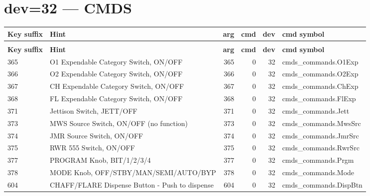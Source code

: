 \documentclass[10pt,a4paper]{article}
\begin{document}
\section{dev=32 — CMDS}
\begin{longtable}{>{\ttfamily\small}p{38mm} >{\small}p{72mm} r r r >{\ttfamily\small}p{48mm}}
\toprule
\textbf{Key suffix} & \textbf{Hint} & \textbf{arg} & \textbf{cmd} & \textbf{dev} & \textbf{cmd symbol} \\
\midrule
\endfirsthead
\multicolumn{6}{l}{\small\itshape continued\ldots}\\
\toprule
\textbf{Key suffix} & \textbf{Hint} & \textbf{arg} & \textbf{cmd} & \textbf{dev} & \textbf{cmd symbol} \\
\midrule
\endhead
\bottomrule
\endfoot
\rowcolor{rowodd}
  365 & O1 Expendable Category Switch, ON/OFF & 365 & 0 & 32 & cmds\_commands.O1Exp \\
  366 & O2 Expendable Category Switch, ON/OFF & 366 & 0 & 32 & cmds\_commands.O2Exp \\
\rowcolor{rowodd}
  367 & CH Expendable Category Switch, ON/OFF & 367 & 0 & 32 & cmds\_commands.ChExp \\
  368 & FL Expendable Category Switch, ON/OFF & 368 & 0 & 32 & cmds\_commands.FlExp \\
\rowcolor{rowodd}
  371 & Jettison Switch, JETT/OFF & 371 & 0 & 32 & cmds\_commands.Jett \\
  373 & MWS Source Switch, ON/OFF (no function) & 373 & 0 & 32 & cmds\_commands.MwsSrc \\
\rowcolor{rowodd}
  374 & JMR Source Switch, ON/OFF & 374 & 0 & 32 & cmds\_commands.JmrSrc \\
  375 & RWR 555 Switch, ON/OFF & 375 & 0 & 32 & cmds\_commands.RwrSrc \\
\rowcolor{rowodd}
  377 & PROGRAM Knob, BIT/1/2/3/4 & 377 & 0 & 32 & cmds\_commands.Prgm \\
  378 & MODE Knob, OFF/STBY/MAN/SEMI/AUTO/BYP & 378 & 0 & 32 & cmds\_commands.Mode \\
\rowcolor{rowodd}
  604 & CHAFF/FLARE Dispense Button - Push to dispense & 604 & 0 & 32 & cmds\_commands.DispBtn \\
\end{longtable}
\end{document}
